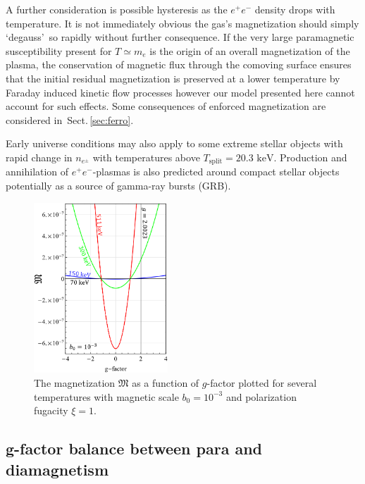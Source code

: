 \documentclass[aps,prd,floatfix,reprint]{revtex4-2}
\newcommand*{\keV}{\text{ keV}}
\newcommand{\rsec}[1]{Sect.\,{\ref{#1}}}
\begin{document}
A further consideration is possible hysteresis as the $e^{+}e^{-}$ density drops with temperature. It is not immediately obvious the gas's magnetization should simply \lq degauss\rq\ so rapidly without further consequence. If the very large paramagnetic susceptibility present for $T\simeq m_{e}$ is the origin of an overall magnetization of the plasma, the conservation of magnetic flux through the comoving surface ensures that the initial residual magnetization is preserved at a lower temperature by Faraday induced kinetic flow processes however our model presented here cannot account for such effects. Some consequences of enforced magnetization are considered in~\rsec{sec:ferro}.

Early universe conditions may also apply to some extreme stellar objects with rapid change in $n_{e^{\pm}}$ with temperatures above $T_\mathrm{split}=20.3\keV$. Production and annihilation of $e^{+}e^{-}$-plasmas is also predicted around compact stellar objects~\cite{Ruffini:2009hg,Ruffini:2012it} potentially as a source of gamma-ray bursts (GRB).

\begin{figure}[ht]
 \centering
 \includegraphics[width=0.45\textwidth]{plots/GFactor_05.png}
 \caption{The magnetization $\mathfrak M$ as a function of $g$-factor plotted for several temperatures with magnetic scale $b_{0}=10^{-3}$ and polarization fugacity $\xi=1$.}
 \label{fig:gfac} 
\end{figure}

\subsection{g-factor balance between para and diamagnetism}
\label{sec:gfac}
\end{document}
